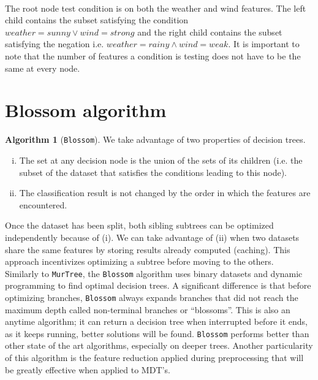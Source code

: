 \documentclass[12pt]{report}
\theoremstyle{definition}
\theoremstyle{definition}
\newtheorem*{algo}{Algorithm}
\theoremstyle{definition}
\begin{document}
\paragraph{} The root node test condition is on both the weather and wind features. The left child contains the subset satisfying the condition $weather=sunny \lor wind=strong$ and the right child contains the subset satisfying the negation i.e. $weather=rainy \land wind=weak$. It is important to note that the number of features a condition is testing does not have to be the same at every node.


\section{Blossom algorithm}

\begin{algo}[\texttt{Blossom\cite{blossom}}]
    We take advantage of two properties of decision trees. 
    \begin{enumerate}[(i)]
        \item The set at any decision node is the union of the sets of its children (i.e. the subset of the dataset that satisfies the conditions leading to this node).
        \item The classification result is not changed by the order in which the features are encountered.
    \end{enumerate}
    
    Once the dataset has been split, both sibling subtrees can be optimized independently because of (i). We can take advantage of (ii) when two datasets share the same features by storing results already computed (caching). This approach incentivizes optimizing a subtree before moving to the others.\\

    Similarly to \texttt{MurTree\cite{murtree}}, the \texttt{Blossom} algorithm uses binary datasets and dynamic programming to find optimal decision trees. A significant difference is that before optimizing branches, \texttt{Blossom} always expands branches that did not reach the maximum depth called non-terminal branches or ``blossoms''. This is also an anytime algorithm; it can return a decision tree when interrupted before it ends, as it keeps running, better solutions will be found. \texttt{Blossom} performs better than other state of the art algorithms, especially on deeper trees. Another particularity of this algorithm is the feature reduction applied during preprocessing that will be greatly effective when applied to MDT's.
\end {algo}
\end{document}
